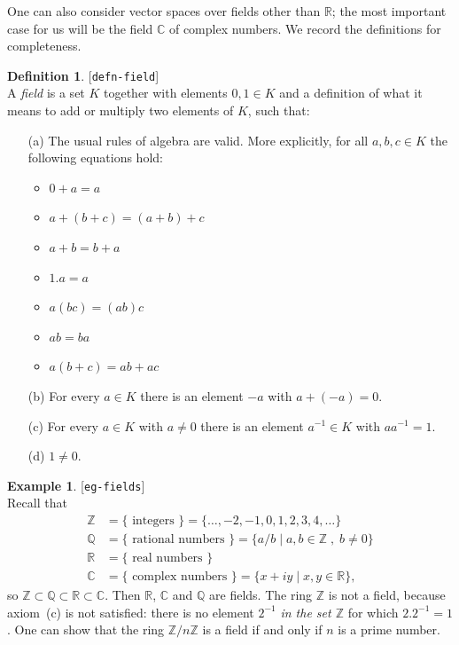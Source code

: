 \documentclass{amsart}
\newcommand{\lbl}[1]{\label{#1}\textup{[\texttt{#1}]}\ \\}
\newcommand{\lbl}{\label}
\newcommand{\R}         {{\mathbb{R}}}
\newcommand{\C}         {{\mathbb{C}}}
\newcommand{\Q}         {{\mathbb{Q}}}
\newcommand{\Z}         {{\mathbb{Z}}}
\newcommand{\st}        {\;|\;}
\renewcommand{\:}       {\colon}
\theoremstyle{definition}
\newtheorem{definition}[theorem]{Definition}
\newtheorem{example}[theorem]{Example}
\begin{document}
One can also consider vector spaces over fields other than
$\R$; the most important case for us will be the field $\C$
of complex numbers.  We record the definitions for
completeness. 
\begin{definition}\lbl{defn-field}
 A \emph{field} is a set $K$ together with elements
 $0,1\in K$ and a definition of what it means to add or
 multiply two elements of $K$, such that:
 \begin{enumerate}
  \item[(a)] The usual rules of algebra are valid.  More
   explicitly, for all $a,b,c\in K$ the following equations
   hold: 
   \begin{itemize}
    \item $0+a=a$
    \item $a+(b+c)=(a+b)+c$
    \item $a+b=b+a$
    \item $1.a=a$
    \item $a(bc)=(ab)c$
    \item $ab=ba$
    \item $a(b+c)=ab+ac$
   \end{itemize}
  \item[(b)] For every $a\in K$ there is an element $-a$ with
   $a+(-a)=0$.
  \item[(c)] For every $a\in K$ with $a\neq 0$ there is an
   element $a^{-1}\in K$ with $aa^{-1}=1$.
  \item[(d)] $1\neq 0$.
 \end{enumerate}
\end{definition}
\begin{example}\lbl{eg-fields}
 Recall that 
 \begin{align*}
  \Z &= \{ \text{ integers } \} =
        \{ \dotsc,-2,-1,0,1,2,3,4,\dotsc \} \\
  \Q &= \{ \text{ rational numbers } \} =
        \{ a/b\st a,b\in\Z\;,\; b\neq 0\} \\
  \R &= \{ \text{ real numbers } \} \\
  \C &= \{ \text{ complex numbers } \} = 
        \{ x+iy\st x,y\in\R \},
 \end{align*}
 so $\Z\subset\Q\subset\R\subset\C$.  Then $\R$, $\C$ and
 $\Q$ are fields.  The ring $\Z$ is not a field, because
 axiom~(c) is not satisfied: there is no element $2^{-1}$
 \emph{in the set $\Z$} for which $2.2^{-1}=1$.  One can
 show that the ring $\Z/n\Z$ is a field if and only if $n$
 is a prime number.
\end{example}
\end{document}
